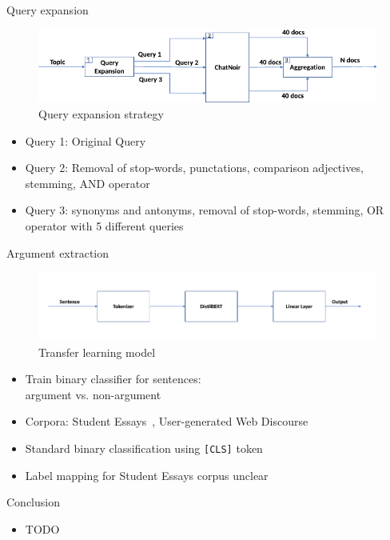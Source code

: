 \documentclass[english]{mlutalk}
\begin{document}
\begin{frame}[allowframebreaks]{Query expansion}
  \begin{figure}
    \centering
    \includegraphics[width=0.8\linewidth]{figures/distilbert-based-arg-retrieval-query-expansion.pdf}
    \caption{Query expansion strategy~\cite{AlhamzehBEM2021}}
    \label{query-expansion}
  \end{figure}

  \begin{itemize}
    \item Query 1: Original Query
    \item Query 2: Removal of stop-words, punctations, comparison adjectives, stemming, AND operator
    \item Query 3: synonyms and antonyms, removal of stop-words, stemming, OR operator with 5 different queries
  \end{itemize}
\end{frame}

\begin{frame}{Argument extraction~\cite{AlhamzehBEM2021}}
  \begin{figure}
    \centering
    \includegraphics[width=0.7\linewidth]{figures/distilbert-based-arg-retrieval-processing.pdf}
    \caption{Transfer learning model~\cite{AlhamzehBEM2021}}
    \label{model}
  \end{figure}

  \begin{itemize}
    \item Train binary classifier for sentences: \\ argument vs. non-argument
    \item Corpora: Student Essays~\cite{HabernalG2017}, User-generated Web Discourse~\cite{StabG2014}
    \item Standard binary classification using \texttt{[CLS]} token
    \item Label mapping for Student Essays corpus unclear
  \end{itemize}
\end{frame}

\begin{frame}{Conclusion}
  \begin{itemize}
    \item TODO
  \end{itemize}
  \thankyou
\end{frame}

\appendix
\section{\appendixname}

\bibliographyframe
\end{document}
